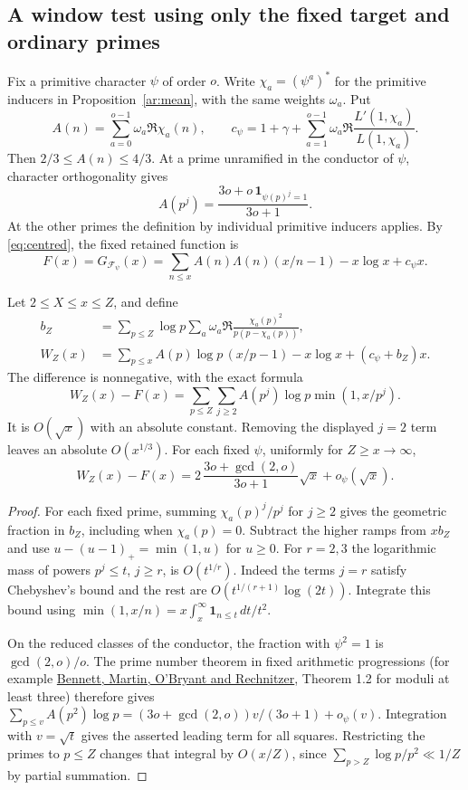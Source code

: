 \subsection{A window test using only the fixed target and ordinary primes}\label{pref:section}

Fix a primitive character \(\psi\) of order \(o\). Write
\(\chi_a=(\psi^a)^\ast\) for the primitive inducers in
Proposition~\ref{ar:mean}, with the same weights \(\omega_a\). Put
\[
 A(n)=\sum_{a=0}^{o-1}\omega_a\Re\chi_a(n),\qquad
 c_\psi=1+\gamma+\sum_{a=1}^{o-1}\omega_a
                      \Re\frac{L'(1,\chi_a)}{L(1,\chi_a)} .
\]
Then \(2/3\le A(n)\le4/3\). At a prime unramified in the conductor
of \(\psi\), character orthogonality gives
\[
 A(p^j)=\frac{3o+o\,\mathbf1_{\psi(p)^j=1}}{3o+1}.
\]
At the other primes the definition by individual primitive inducers
applies. By \eqref{eq:centred}, the fixed retained function is
\[
 F(x)=G_{\mathcal F_\psi}(x)
     =\sum_{n\le x}A(n)\Lambda(n)(x/n-1)-x\log x+c_\psi x .
\]

\begin{proposition}\label{pref:powers}
Let \(2\le X\le x\le Z\), and define
\[
\begin{aligned}
 b_Z&=\sum_{p\le Z}\log p\sum_a\omega_a\Re
           \frac{\chi_a(p)^2}{p(p-\chi_a(p))},\\
 W_Z(x)&=\sum_{p\le x} A(p)\log p\,(x/p-1)
                       -x\log x+(c_\psi+b_Z)x .
\end{aligned}
\]
The difference is nonnegative, with the exact formula
\[
 W_Z(x)-F(x)=\sum_{p\le Z}\sum_{j\ge2}
           A(p^j)\log p\min(1,x/p^j).
\]
It is \(O(\sqrt x)\) with an absolute constant. Removing the displayed
\(j=2\) term leaves an absolute \(O(x^{1/3})\). For each fixed
\(\psi\), uniformly for \(Z\ge x\to\infty\),
\[
 W_Z(x)-F(x)=
       2\,\frac{3o+\gcd(2,o)}{3o+1}\sqrt{x}+o_\psi(\sqrt x).
\]
\end{proposition}
\begin{proof}
For each fixed prime, summing \(\chi_a(p)^j/p^j\) for \(j\ge2\)
gives the geometric fraction in \(b_Z\), including when \(\chi_a(p)=0\).
Subtract the higher ramps from \(xb_Z\) and use
\(u-(u-1)_+=\min(1,u)\) for \(u\ge0\). For \(r=2,3\) the logarithmic
mass of powers \(p^j\le t\), \(j\ge r\), is \(O(t^{1/r})\).
Indeed the terms \(j=r\) satisfy Chebyshev's bound and the rest are
\(O(t^{1/(r+1)}\log(2t))\). Integrate this bound using
\(\min(1,x/n)=x\int_x^\infty\mathbf1_{n\le t}\,dt/t^2\).

On the reduced classes of the conductor, the fraction with
\(\psi^2=1\) is \(\gcd(2,o)/o\). The prime number theorem in fixed
arithmetic progressions (for example
\href{https://arxiv.org/abs/1802.00085}{Bennett, Martin, O'Bryant and
Rechnitzer}, Theorem 1.2 for moduli at least three) therefore gives
\(\sum_{p\le v}A(p^2)\log p=(3o+\gcd(2,o))v/(3o+1)+o_\psi(v)\).
Integration with \(v=\sqrt t\) gives the asserted leading term for
all squares. Restricting the primes to \(p\le Z\) changes that
integral by \(O(x/Z)\), since
\(\sum_{p>Z}\log p/p^2\ll 1/Z\) by partial summation.
\end{proof}

